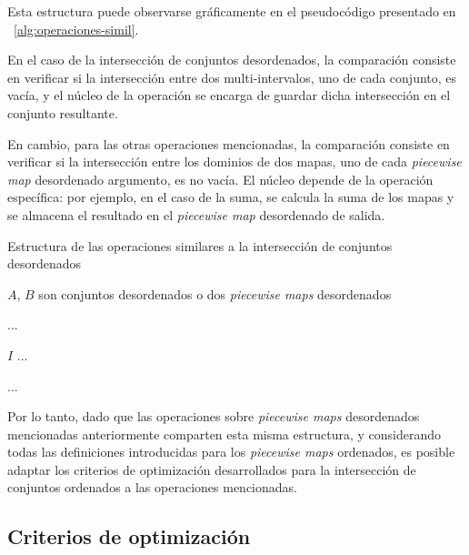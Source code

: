Esta estructura puede observarse gráficamente en el pseudocódigo presentado en ~\ref{alg:operaciones-simil}.

En el caso de la intersección de conjuntos desordenados, la comparación consiste en verificar si la intersección entre dos multi-intervalos, uno de cada conjunto, es vacía, y el núcleo de la operación se encarga de guardar dicha intersección en el conjunto resultante.

En cambio, para las otras operaciones mencionadas, la comparación consiste en verificar si la intersección entre los dominios de dos mapas, uno de cada \textit{piecewise map} desordenado argumento, es no vacía. El núcleo depende de la operación específica: por ejemplo, en el caso de la suma, se calcula la suma de los mapas y se almacena el resultado en el \textit{piecewise map} desordenado de salida.


\begin{algorithm}
\caption{Estructura de las operaciones similares a la intersección de conjuntos desordenados}\label{alg:operaciones-simil}
\begin{algorithmic}[1]
\Require $A$, $B$ son conjuntos desordenados o dos \textit{piecewise maps} desordenados

\State ... 

 
        \State $I$ 
            \State ...  
        \EndIf
    \EndFor
\EndFor

\State \Return ...
\EndFunction
\end{algorithmic}
\end{algorithm}

Por lo tanto, dado que las operaciones sobre \textit{piecewise maps} desordenados mencionadas anteriormente comparten esta misma estructura, y considerando todas las definiciones introducidas para los \textit{piecewise maps} ordenados, es posible adaptar los criterios de optimización desarrollados para la intersección de conjuntos ordenados a las operaciones mencionadas.

\subsection{Criterios de optimización}


